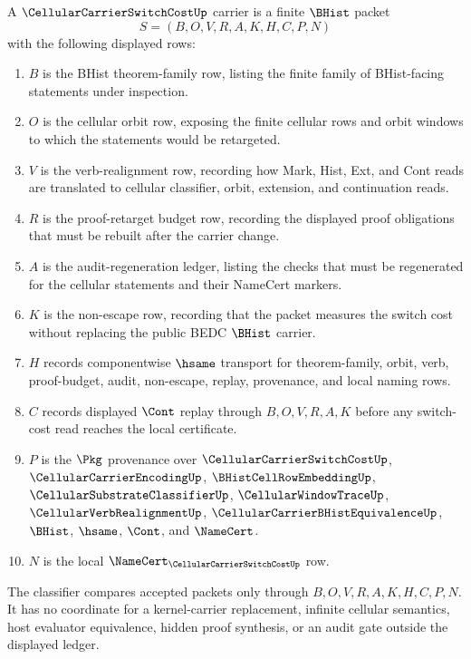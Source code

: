 \begin{definition}
\label{def:cellular-carrier-switch-cost-carrier}
A $\CellularCarrierSwitchCostUp$ carrier is a finite $\BHist$ packet
$$
S=(B,O,V,R,A,K,H,C,P,N)
$$
with the following displayed rows:
\begin{enumerate}
\item $B$ is the BHist theorem-family row, listing the finite family of BHist-facing statements under inspection.
\item $O$ is the cellular orbit row, exposing the finite cellular rows and orbit windows to which the statements would be retargeted.
\item $V$ is the verb-realignment row, recording how Mark, Hist, Ext, and Cont reads are translated to cellular classifier, orbit, extension, and continuation reads.
\item $R$ is the proof-retarget budget row, recording the displayed proof obligations that must be rebuilt after the carrier change.
\item $A$ is the audit-regeneration ledger, listing the checks that must be regenerated for the cellular statements and their NameCert markers.
\item $K$ is the non-escape row, recording that the packet measures the switch cost without replacing the public BEDC $\BHist$ carrier.
\item $H$ records componentwise $\hsame$ transport for theorem-family, orbit, verb, proof-budget, audit, non-escape, replay, provenance, and local naming rows.
\item $C$ records displayed $\Cont$ replay through $B,O,V,R,A,K$ before any switch-cost read reaches the local certificate.
\item $P$ is the $\Pkg$ provenance over $\CellularCarrierSwitchCostUp$, $\CellularCarrierEncodingUp$, $\BHistCellRowEmbeddingUp$, $\CellularSubstrateClassifierUp$, $\CellularWindowTraceUp$, $\CellularVerbRealignmentUp$, $\CellularCarrierBHistEquivalenceUp$, $\BHist$, $\hsame$, $\Cont$, and $\NameCert$.
\item $N$ is the local $\NameCert_{\CellularCarrierSwitchCostUp}$ row.
\end{enumerate}
The classifier compares accepted packets only through $B,O,V,R,A,K,H,C,P,N$. It has no coordinate for a kernel-carrier replacement, infinite cellular semantics, host evaluator equivalence, hidden proof synthesis, or an audit gate outside the displayed ledger.
\end{definition}

